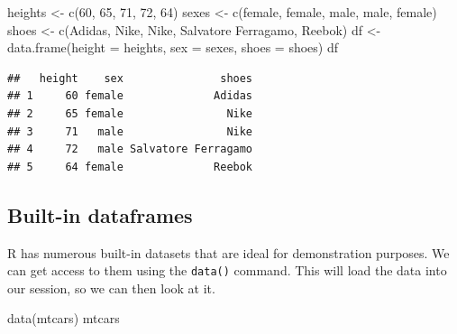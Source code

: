 \documentclass[
]{book}
\newenvironment{Shaded}{\begin{snugshade}}{\end{snugshade}}
\newcommand{\AttributeTok}[1]{\textcolor[rgb]{0.77,0.63,0.00}{#1}}
\newcommand{\DecValTok}[1]{\textcolor[rgb]{0.00,0.00,0.81}{#1}}
\newcommand{\FunctionTok}[1]{\textcolor[rgb]{0.00,0.00,0.00}{#1}}
\newcommand{\NormalTok}[1]{#1}
\newcommand{\OtherTok}[1]{\textcolor[rgb]{0.56,0.35,0.01}{#1}}
\newcommand{\StringTok}[1]{\textcolor[rgb]{0.31,0.60,0.02}{#1}}
\begin{document}
\begin{Shaded}
\begin{Highlighting}[]
\NormalTok{heights }\OtherTok{\textless{}{-}} \FunctionTok{c}\NormalTok{(}\DecValTok{60}\NormalTok{, }\DecValTok{65}\NormalTok{, }\DecValTok{71}\NormalTok{, }\DecValTok{72}\NormalTok{, }\DecValTok{64}\NormalTok{)}
\NormalTok{sexes }\OtherTok{\textless{}{-}} \FunctionTok{c}\NormalTok{(}\StringTok{\textquotesingle{}female\textquotesingle{}}\NormalTok{, }\StringTok{\textquotesingle{}female\textquotesingle{}}\NormalTok{, }\StringTok{\textquotesingle{}male\textquotesingle{}}\NormalTok{, }\StringTok{\textquotesingle{}male\textquotesingle{}}\NormalTok{, }\StringTok{\textquotesingle{}female\textquotesingle{}}\NormalTok{)}
\NormalTok{shoes }\OtherTok{\textless{}{-}} \FunctionTok{c}\NormalTok{(}\StringTok{\textquotesingle{}Adidas\textquotesingle{}}\NormalTok{, }\StringTok{\textquotesingle{}Nike\textquotesingle{}}\NormalTok{, }\StringTok{\textquotesingle{}Nike\textquotesingle{}}\NormalTok{, }\StringTok{\textquotesingle{}Salvatore Ferragamo\textquotesingle{}}\NormalTok{, }\StringTok{\textquotesingle{}Reebok\textquotesingle{}}\NormalTok{)}
\NormalTok{df }\OtherTok{\textless{}{-}} \FunctionTok{data.frame}\NormalTok{(}\AttributeTok{height =}\NormalTok{ heights, }\AttributeTok{sex =}\NormalTok{ sexes, }\AttributeTok{shoes =}\NormalTok{ shoes)}
\NormalTok{df}
\end{Highlighting}
\end{Shaded}

\begin{verbatim}
##   height    sex               shoes
## 1     60 female              Adidas
## 2     65 female                Nike
## 3     71   male                Nike
## 4     72   male Salvatore Ferragamo
## 5     64 female              Reebok
\end{verbatim}

\hypertarget{built-in-dataframes}{%
\subsection{Built-in dataframes}\label{built-in-dataframes}}

R has numerous built-in datasets that are ideal for demonstration purposes. We can get access to them using the \texttt{data()} command. This will load the data into our session, so we can then look at it.

\begin{Shaded}
\begin{Highlighting}[]
\FunctionTok{data}\NormalTok{(}\StringTok{\textquotesingle{}mtcars\textquotesingle{}}\NormalTok{)}
\NormalTok{mtcars}
\end{Highlighting}
\end{Shaded}
\end{document}
